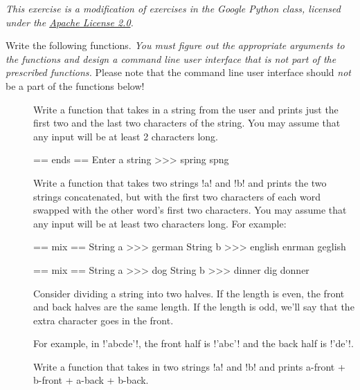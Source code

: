 \documentclass[11pt]{cselabheader}
\begin{document}
\begin{ex}[stringfun.py] 
\emph{This exercise is a modification of exercises in the Google Python
  class, licensed under the
  \href{http://www.apache.org/licenses/LICENSE-2.0.html}{Apache License 2.0}.}

Write the following functions. \emph{You must figure out the appropriate
  arguments to the functions and design a command line user interface that is
not part of the prescribed functions.} Please note that the command line user
interface should \emph{not} be a part of the functions below!

\begin{description}
  \item[]
  Write a function that takes in a string from the user and
  prints just the first two and the last two characters of the string.
  You may assume that any input will be at least 2 characters long.

  \begin{verbatimcode}
== ends ==
Enter a string >>> spring
spng
  \end{verbatimcode}

  \item[]
Write a function that takes two strings \pythoninline!a! and
  \pythoninline!b! and prints the two strings concatenated, but with the first
  two characters of each word swapped with the other word's first two
  characters. You may assume that any input will be at least two characters
  long.
  For example:

  \begin{verbatimcode}
== mix ==
String a >>> german
String b >>> english
enrman geglish
  \end{verbatimcode}

  \begin{verbatimcode}
== mix ==
String a >>> dog
String b >>> dinner
dig donner
  \end{verbatimcode}

  \item[]
Consider dividing a string into two halves. If the length
  is even, the front and back halves are the same length. If the length is odd,
  we'll say that the extra character goes in the front. 

  For example, in \pythoninline!'abcde'!, the front half is \pythoninline!'abc'!
  and the back half is \pythoninline!'de'!. 

  Write a function that takes in two strings \pythoninline!a! and
  \pythoninline!b!  and prints a-front + b-front + a-back + b-back.


\end{description}
\end{ex}
\end{document}
